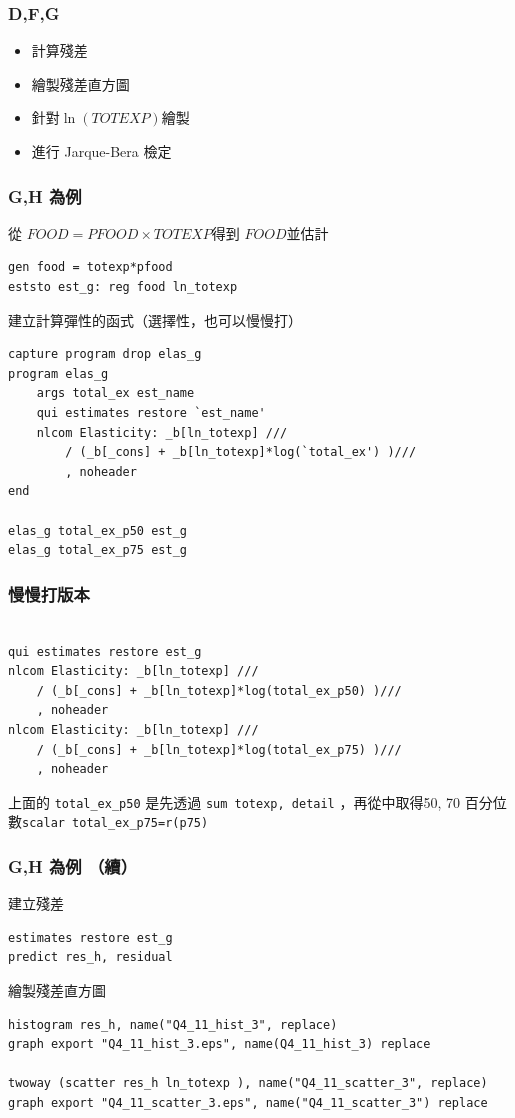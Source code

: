 \begin{frame}
    \frametitle{D,F,G}

    \begin{itemize}
        \item 計算殘差
        \item 繪製殘差直方圖
        \item 針對$\ln(TOTEXP)$繪製
        \item 進行 Jarque-Bera 檢定
    \end{itemize}
\end{frame}

\begin{frame}[fragile]
    \frametitle{G,H 為例}
    從 $FOOD = PFOOD \times TOTEXP$得到 $FOOD$並估計
    \begin{lstlisting}
gen food = totexp*pfood
eststo est_g: reg food ln_totexp\end{lstlisting}

    \vfill
    建立計算彈性的函式（選擇性，也可以慢慢打）
    \begin{lstlisting}
capture program drop elas_g
program elas_g
    args total_ex est_name
    qui estimates restore `est_name'
    nlcom Elasticity: _b[ln_totexp] ///
        / (_b[_cons] + _b[ln_totexp]*log(`total_ex') )///
        , noheader
end
        
elas_g total_ex_p50 est_g
elas_g total_ex_p75 est_g\end{lstlisting}
\end{frame}

\begin{frame}[fragile]
    \frametitle{慢慢打版本}
    \begin{lstlisting}

qui estimates restore est_g
nlcom Elasticity: _b[ln_totexp] ///
    / (_b[_cons] + _b[ln_totexp]*log(total_ex_p50) )///
    , noheader     
nlcom Elasticity: _b[ln_totexp] ///
    / (_b[_cons] + _b[ln_totexp]*log(total_ex_p75) )///
    , noheader \end{lstlisting}

上面的 \texttt{total\_ex\_p50} 是先透過 \texttt{sum totexp, detail} ，再從中取得50, 70 百分位數\texttt{scalar total\_ex\_p75=r(p75)}
\end{frame}

\begin{frame}[fragile]
    \frametitle{G,H 為例 （續）}
    建立殘差
    \begin{lstlisting}
estimates restore est_g
predict res_h, residual\end{lstlisting}
    繪製殘差直方圖
    \begin{lstlisting}
histogram res_h, name("Q4_11_hist_3", replace)
graph export "Q4_11_hist_3.eps", name(Q4_11_hist_3) replace

twoway (scatter res_h ln_totexp ), name("Q4_11_scatter_3", replace)
graph export "Q4_11_scatter_3.eps", name("Q4_11_scatter_3") replace\end{lstlisting}
\end{frame}

